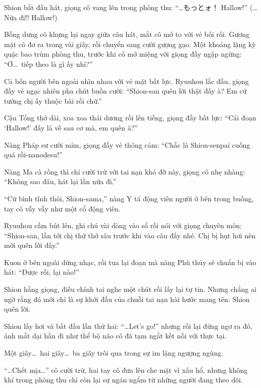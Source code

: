 \documentclass[../main.tex]{subfiles}
\begin{document}

Shion bắt đầu hát, giọng cô vang lên trong phòng thu: ``{\fotskip…もっとォ！ Hallow!}'' (\dots Nữa đi!! Hallow!)

Bỗng dưng cô khựng lại ngay giữa câu hát, mắt cô mở to với vẻ bối rối. Gương mặt cô đơ ra trong vài giây, rồi chuyển sang cười gượng gạo. Một khoảng lặng kỳ quặc bao trùm phòng thu, trước khi cô mở miệng với giọng đầy ngập ngừng: ``Ơ\dots\ tiếp theo là gì ấy nhỉ?''


Cả bốn người bên ngoài nhìn nhau với vẻ mặt bất lực. Ryuuhou lắc đầu, giọng đầy vẻ ngạc nhiên pha chút buồn cười: ``Shion-san quên lời thật đấy à? Em cứ tưởng chị ấy thuộc bài rồi chứ.''

Cậu Tổng thở dài, xoa xoa thái dương rồi lên tiếng, giọng đầy bất lực: ``Cái đoạn `Hallow!' đấy là về sau cơ mà, em quên à?''

Nàng Pháp sư cười mỉm, giọng đầy vẻ thông cảm: ``Chắc là Shion-senpai cuống quá rồi-nanodesu!''

Nàng Ma cà rồng thì chỉ cười trừ với tai nạn khó đỡ này, giọng cô nhẹ nhàng: ``Không sao đâu, hát lại lần nữa đi.''

``Cứ bình tĩnh thôi, Shion-sama,'' nàng Y tá động viên người ở bên trong buồng, tay cô vẫy vẫy như một cổ động viên.

Ryuuhou cầm bút lên, ghi chú vài dòng vào sổ rồi nói với giọng chuyên môn: ``Shion-san, lần tới chị thử thở sâu trước khi vào câu đấy nhé. Chị bị hụt hơi nên mới quên lời đấy.''

Kuon ở bên ngoài dừng nhạc, rồi tua lại đoạn mà nàng Phù thủy sẽ chuẩn bị vào hát: ``Được rồi, lại nào!''

Shion hắng giọng, điều chỉnh tai nghe một chút rồi lấy lại tự tin. Nhưng chẳng ai ngờ rằng đó mới chỉ là sự khởi đầu của chuỗi tai nạn hài hước mang tên: Shion quên lời.


Shion lấy hơi và bắt đầu lần thứ hai: ``{\fotskip …Let's go!}'' nhưng rồi lại đứng ngơ ra đó, ánh mắt dại hẳn đi như thể bộ não cô đã tạm ngắt kết nối với thực tại.

Một giây\dots\ hai giây\dots\ ba giây trôi qua trong sự im lặng ngượng ngùng.

``\dots Chết mịa\dots'' cô cười trừ, hai tay cô đưa lên che mặt vì xấu hổ, nhưng không khí trong phòng thu chỉ còn lại sự ngán ngẩm từ những người đang theo dõi.

\end{document}
